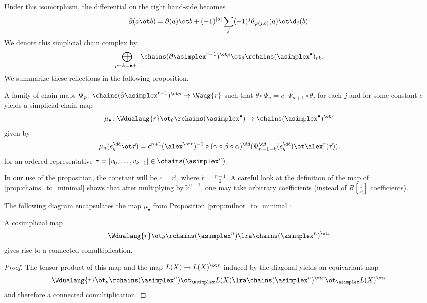{Under this isomorphism, the differential on the right hand-side becomes
\[
	\partial(a\ot b) = \partial(a)\ot b + (-1)^{|a|}\sum_j (-1)^j \theta_{\varphi(j,b)}(a)\ot \d_j(b).
\]
We denote this simplicial chain complex by %
\[
\bigoplus_{p+k=\bullet+1}\chains(\partial\asimplex^{r-1})^{\ot p}\ot_\theta \rchains(\asimplex^\bullet)_{rk}.
\]
We summarize these reflections in the following proposition.
\begin{proposition}\label{prop:milnor_to_minimal}
	A family of chain maps $\Psi_p\colon \chains(\partial \asimplex^{r-1})^{\ot p}\to \Waug{r}$ such that $ \theta\circ \Psi_n = c \cdot  \Psi_{n+1} \circ \theta_j$ for each $j$ and for some constant $c$ yields a simplicial chain map 
\[
	\mu_\bullet\colon \Wdualaug{r}\ot_\theta \rchains(\asimplex^\bullet)\to \chains(\asimplex^\bullet)^{\ot r}
\]
given by 
\[
	\mu_n(e_q^\dd\ot \vec{\tau}) = c^{n+1}(\alex^{\ot r})^{-1}\circ(\gamma\circ \beta\circ \alpha)^\dd (\Psi_{n+1-k}^\dd(e_q^\dd)\ot \alex^r(\vec{\tau})), %
\]
for an ordered representative $\tau=[v_0,\dots,v_{k-1}]\in \chains(\asimplex^n)$.
\end{proposition}
\begin{remark}\label{remark:many_coefficients}
	In our use of the proposition, the constant will be $c= \tilde{r}!$, where $\tilde{r} = \frac{r-1}{2}$. A careful look at the definition of the map of \cref{prop:chains_to_minimal} shows that after multiplying by $\tilde{r}^{n+1}$, one may take arbitrary coefficients (instead of $R[\frac{1}{\tilde{r}!}]$ coefficients).
\end{remark}

The following diagram encapsulates the map $\mu_\bullet$ from Proposition \ref{prop:milnor_to_minimal}:










\begin{proposition}\label{prop:cosimplicial}
	A cosimplicial map
	\[
	\Wdualaug{r}\ot_\theta \rchains(\asimplex^n)\lra \chains(\asimplex^n)^{\ot r}
	\]
	gives rise to a connected comultiplication.
\end{proposition}
\begin{proof}
	The tensor product of this map and the map $L(X)\to L(X)^{\ot r}$ induced by the diagonal yields an equivariant map 
	\[
	\Wdualaug{r}\ot_\theta \rchains(\asimplex^n)\ot_{\asimplex} L(X)\lra \chains(\asimplex^n)^{\ot r}\ot_{\asimplex} L(X)^{\ot r}
	\]
	and therefore a connected comultiplication.
\end{proof}
}
